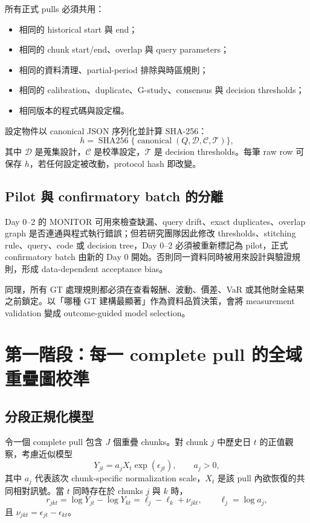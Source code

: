 \documentclass[12pt,a4paper,oneside]{article}
\begin{document}
所有正式 pulls 必須共用：
\begin{itemize}
  \item 相同的 historical start 與 end；
  \item 相同的 chunk start/end、overlap 與 query parameters；
  \item 相同的資料清理、partial-period 排除與時區規則；
  \item 相同的 calibration、duplicate、G-study、consensus 與 decision thresholds；
  \item 相同版本的程式碼與設定檔。
\end{itemize}

設定物件以 canonical JSON 序列化並計算 SHA-256：
\begin{equation}
h=\operatorname{SHA256}\{\operatorname{canonical}(Q,\mathcal{D},\mathcal{C},\mathcal{T})\},
\end{equation}
其中 $\mathcal{D}$ 是蒐集設計，$\mathcal{C}$ 是校準設定，$\mathcal{T}$ 是 decision thresholds。每筆 raw row 可保存 $h$，若任何設定被改動，protocol hash 即改變。

\subsection{Pilot 與 confirmatory batch 的分離}

Day 0--2 的 MONITOR 可用來檢查缺漏、query drift、exact duplicates、overlap graph 是否連通與程式執行錯誤；但若研究團隊因此修改 thresholds、stitching rule、query、code 或 decision tree，Day 0--2 必須被重新標記為 pilot，正式 confirmatory batch 由新的 Day 0 開始。否則同一資料同時被用來設計與驗證規則，形成 data-dependent acceptance bias。

同理，所有 GT 處理規則都必須在查看報酬、波動、價差、VaR 或其他財金結果之前鎖定。以「哪種 GT 建構最顯著」作為資料品質決策，會將 measurement validation 變成 outcome-guided model selection。

\section{第一階段：每一 complete pull 的全域重疊圖校準}

\subsection{分段正規化模型}

令一個 complete pull 包含 $J$ 個重疊 chunks。對 chunk $j$ 中歷史日 $t$ 的正值觀察，考慮近似模型
\begin{equation}
Y_{jt}=a_j X_t\exp(\epsilon_{jt}),
\qquad a_j>0,
\label{eq:chunkmodel}
\end{equation}
其中 $a_j$ 代表該次 chunk-specific normalization scale，$X_t$ 是該 pull 內欲恢復的共同相對訊號。當 $t$ 同時存在於 chunks $j$ 與 $k$ 時，
\begin{equation}
r_{jkt}=\log Y_{jt}-\log Y_{kt}
=\ell_j-\ell_k+\nu_{jkt},
\qquad \ell_j=\log a_j,
\label{eq:edgeobservation}
\end{equation}
且 $\nu_{jkt}=\epsilon_{jt}-\epsilon_{kt}$。
\end{document}
